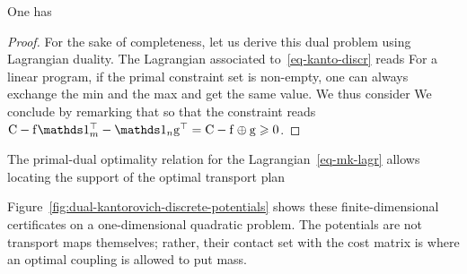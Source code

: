 \begin{prop}\label{prop-duality-discr}
One has
\eql{\label{eq-dual}
	\MKD_\C(\a,\b) =
	\umax{(\fD,\gD) \in \PotentialsD(\a,\b)} \dotp{\fD}{\a} + \dotp{\gD}{\b}
}
\end{prop}

\begin{proof}
%
For the sake of completeness, let us derive this dual problem using Lagrangian duality. The Lagrangian associated to~\eqref{eq-kanto-discr} reads
For a linear program, if the primal constraint set is non-empty, one can always exchange the min and the max and get the same value. We thus consider
We conclude by remarking that
so that the constraint reads $\C - \fD\ones_m^\top - \ones_n \gD^\top = \C-\fD\oplus \gD \geq 0$.
\end{proof}

The primal-dual optimality relation for the Lagrangian~\eqref{eq-mk-lagr} allows locating the support of the optimal transport plan

Figure~\ref{fig:dual-kantorovich-discrete-potentials} shows these finite-dimensional certificates on a one-dimensional quadratic problem.  The potentials are not transport maps themselves; rather, their contact set with the cost matrix is where an optimal coupling is allowed to put mass.


